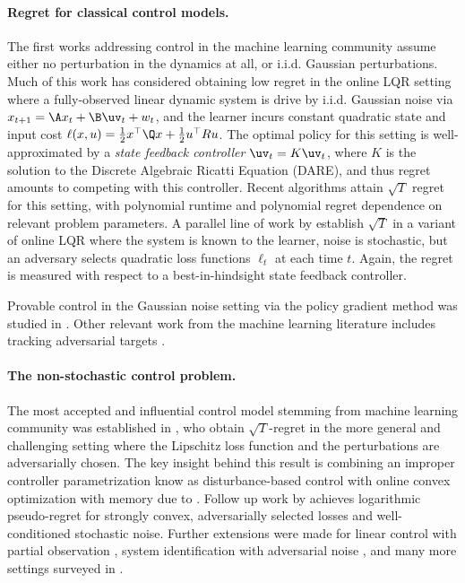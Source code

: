 \paragraph{Regret for classical control models. }
The first works addressing control in the machine learning community assume either no perturbation in the dynamics at all, or i.i.d. Gaussian perturbations. 
Much of this work has considered obtaining low regret in the online LQR setting \citep{abbasi2011regret,dean2018regret,mania2019certainty,cohen2019learning} where a fully-observed linear dynamic system is drive by i.i.d. Gaussian noise via $x_{t+1} = \A x_t + \B \uv_t + w_t$, and the learner incurs constant quadratic state and input cost $\ell(x,u) = \frac{1}{2}x^\top \Q x + \frac{1}{2}u^\top R u$. The optimal policy for this setting is well-approximated by a \emph{state feedback controller} $\uv_t = K \uv_t$, where $K$ is the solution to the Discrete Algebraic Ricatti Equation (DARE), and thus regret amounts to competing with this controller. Recent algorithms \cite{mania2019certainty,cohen2019learning} attain $\sqrt{T}$ regret for this setting, with polynomial runtime and polynomial regret dependence on relevant problem parameters. 
A parallel line of work by  \cite{cohen2018online} establish $\sqrt{T}$ in  a variant of online LQR where the system is known to the learner, noise is stochastic, but an adversary selects quadratic loss functions $\ell_t$ at each time $t$. Again, the regret is measured with respect to a best-in-hindsight state feedback controller.

Provable control in the Gaussian noise setting via the policy gradient method was  studied in \cite{fazel2018global}. Other relevant work from the machine learning literature includes tracking adversarial targets \citep{abbasi2014tracking}.

\paragraph{The non-stochastic control problem.}

The most accepted and influential control model stemming from machine learning community was established in 
\cite{agarwal2019online}, who obtain $\sqrt{T}$-regret in the more general and challenging setting where the Lipschitz loss function {and the perturbations } are adversarially chosen. The key insight behind this result is combining an improper controller parametrization know as disturbance-based control with  online convex optimization with memory due to \cite{anava2015online}. Follow up work by \cite{agarwal2019logarithmic} achieves logarithmic pseudo-regret for strongly convex, adversarially selected losses and well-conditioned stochastic noise. Further extensions were made for linear control with partial observation \cite{simchowitz2020improper}, system identification with adversarial noise \cite{chen2021black}, and many more settings surveyed in \cite{hazan2022introduction}. 



